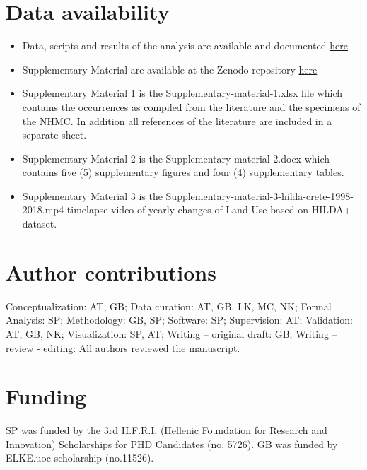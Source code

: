 \section*{Data availability}

\begin{itemize}
    \item Data, scripts and results of the analysis are available and documented \href{https://github.com/savvas-paragkamian/arthropods_assessment_crete}{here} 

    \item Supplementary Material are available at the Zenodo repository \href{https://doi.org/10.5281/zenodo.10635645}{here} 

    \item Supplementary Material 1 is the Supplementary-material-1.xlsx file which
contains the occurrences as compiled from the literature and the specimens of the
NHMC. In addition all references of the literature are included in a separate sheet.

    \item Supplementary Material 2 is the Supplementary-material-2.docx which
contains five (5) supplementary figures and four (4) supplementary tables.
    \item Supplementary Material 3 is the
Supplementary-material-3-hilda-crete-1998-2018.mp4 timelapse video of yearly
changes of Land Use based on HILDA+ dataset.

\end{itemize}

\section*{Author contributions}
Conceptualization: AT, GB;
Data curation: AT, GB, LK, MC, NK;
Formal Analysis: SP; Methodology: GB, SP; Software: SP; Supervision: AT;
Validation: AT, GB, NK; Visualization: SP, AT; Writing – original draft: GB;
Writing – review - editing: All authors reviewed the manuscript.

\section*{Funding}

SP was funded by the 3rd H.F.R.I.
(Hellenic Foundation for Research and Innovation) Scholarships for
PHD Candidates (no. 5726). GB was funded by ELKE.uoc scholarship (no.11526).

